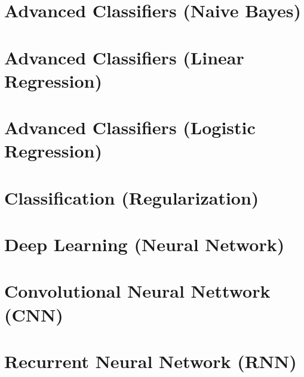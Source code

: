 \documentclass{notesclass}
\begin{document}
\chapter{Advanced Classifiers (Naive Bayes)}


\chapter{Advanced Classifiers (Linear Regression)}


\chapter{Advanced Classifiers (Logistic Regression)}


\chapter{Classification (Regularization)}


\chapter{Deep Learning (Neural Network)}


\chapter{Convolutional Neural Nettwork (CNN)}


\chapter{Recurrent Neural Network (RNN)}



\end{document}
